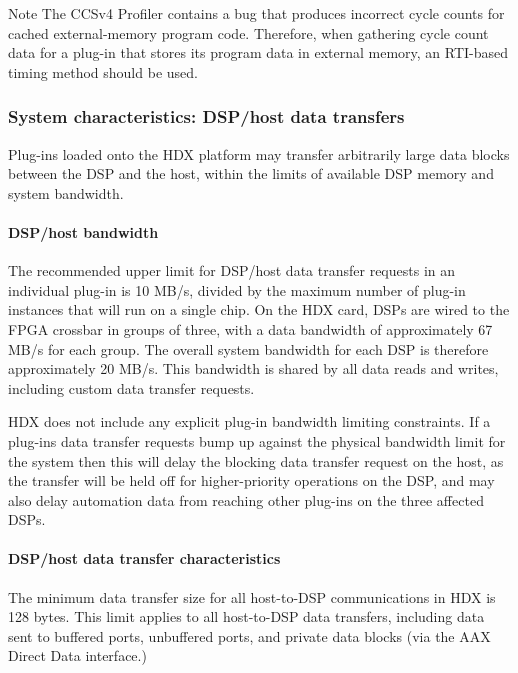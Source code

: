\begin{DoxyNote}{Note}
The C\+C\+Sv4 Profiler contains a bug that produces incorrect cycle counts for cached external-\/memory program code. Therefore, when gathering cycle count data for a plug-\/in that stores its program data in external memory, an R\+T\+I-\/based timing method should be used.
\end{DoxyNote}
\hypertarget{a00362_subsection__system_characteristics_dsphost_data_transfers}{}\subsubsection{System characteristics\+: D\+S\+P/host data transfers}\label{a00362_subsection__system_characteristics_dsphost_data_transfers}
 Plug-\/ins loaded onto the H\+D\+X platform may transfer arbitrarily large data blocks between the D\+S\+P and the host, within the limits of available D\+S\+P memory and system bandwidth.

\hypertarget{a00362_subsubsection__dsphost_bandwidth_}{}\paragraph{D\+S\+P/host bandwidth}\label{a00362_subsubsection__dsphost_bandwidth_}
 The recommended upper limit for D\+S\+P/host data transfer requests in an individual plug-\/in is 10 M\+B/s, divided by the maximum number of plug-\/in instances that will run on a single chip. On the H\+D\+X card, D\+S\+Ps are wired to the F\+P\+G\+A crossbar in groups of three, with a data bandwidth of approximately 67 M\+B/s for each group. The overall system bandwidth for each D\+S\+P is therefore approximately 20 M\+B/s. This bandwidth is shared by all data reads and writes, including custom data transfer requests.

H\+D\+X does not include any explicit plug-\/in bandwidth limiting constraints. If a plug-\/in\textquotesingle{}s data transfer requests bump up against the physical bandwidth limit for the system then this will delay the blocking data transfer request on the host, as the transfer will be held off for higher-\/priority operations on the D\+S\+P, and may also delay automation data from reaching other plug-\/ins on the three affected D\+S\+Ps.

\hypertarget{a00362_subsubsection__dsphost_data_transfer_characteristics_}{}\paragraph{D\+S\+P/host data transfer characteristics}\label{a00362_subsubsection__dsphost_data_transfer_characteristics_}
 The minimum data transfer size for all host-\/to-\/\+D\+S\+P communications in H\+D\+X is 128 bytes. This limit applies to all host-\/to-\/\+D\+S\+P data transfers, including data sent to buffered ports, unbuffered ports, and private data blocks (via the A\+A\+X Direct Data interface.)

